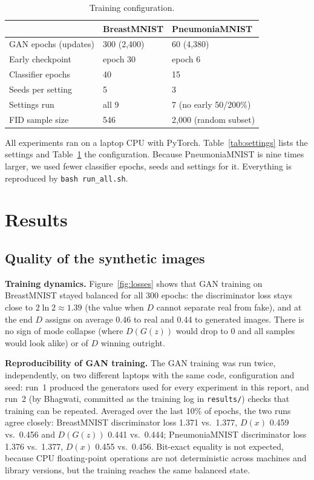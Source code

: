 \begin{table}[htbp]
\centering
\caption{Training configuration.}
\label{tab:hparams}
\small
\begin{tabular}{lll}
\toprule
 & BreastMNIST & PneumoniaMNIST \\
\midrule
GAN epochs (updates)       & 300 (2{,}400) & 60 (4{,}380) \\
Early checkpoint           & epoch 30      & epoch 6 \\
Classifier epochs          & 40            & 15 \\
Seeds per setting          & 5             & 3 \\
Settings run               & all 9         & 7 (no early 50/200\%) \\
FID sample size            & 546           & 2{,}000 (random subset) \\
\bottomrule
\end{tabular}
\end{table}

All experiments ran on a laptop CPU with PyTorch. Table~\ref{tab:settings} lists the settings and Table~\ref{tab:hparams}
the configuration. Because PneumoniaMNIST is nine times larger, we used fewer classifier epochs, seeds and settings for it.
Everything is reproduced by \texttt{bash run\_all.sh}.

\FloatBarrier
\section{Results}
\label{sec:results}

\subsection{Quality of the synthetic images}
\textbf{Training dynamics.} Figure~\ref{fig:losses} shows that GAN training on BreastMNIST stayed balanced for all 300
epochs: the discriminator loss stays close to $2\ln 2\approx1.39$ (the value when $D$ cannot separate real from fake), and
at the end $D$ assigns on average 0.46 to real and 0.44 to generated images. There is no sign of mode collapse (where
$D(G(z))$ would drop to 0 and all samples would look alike) or of $D$ winning outright.

\textbf{Reproducibility of GAN training.} The GAN training was run twice, independently, on two different laptops with
the same code, configuration and seed: run~1 produced the generators used for every experiment in this report, and run~2
(by Bhagwati, committed as the training log in \texttt{results/}) checks that training can be repeated. Averaged over the
last 10\% of epochs, the two runs agree closely: BreastMNIST discriminator loss 1.371 vs.\ 1.377, $D(x)$ 0.459 vs.\ 0.456
and $D(G(z))$ 0.441 vs.\ 0.444; PneumoniaMNIST discriminator loss 1.376 vs.\ 1.377, $D(x)$ 0.455 vs.\ 0.456. Bit-exact
equality is not expected, because CPU floating-point operations are not deterministic across machines and library
versions, but the training reaches the same balanced state.

